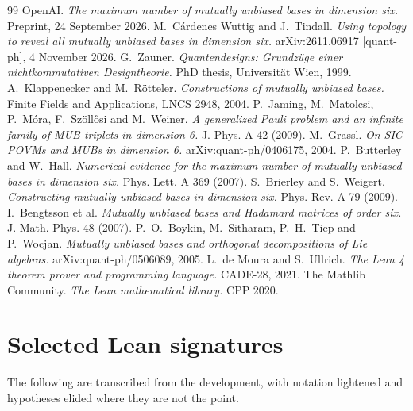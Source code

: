 \documentclass[11pt]{article}
\theoremstyle{definition}
\begin{document}
\begin{thebibliography}{99}
 OpenAI. \emph{The maximum number of mutually unbiased bases in dimension six.}
  Preprint, 24 September 2026.
 M.~C\'ardenes Wuttig and J.~Tindall. \emph{Using topology to reveal all mutually
  unbiased bases in dimension six.} arXiv:2611.06917 [quant-ph], 4 November 2026.
 G.~Zauner. \emph{Quantendesigns: Grundz\"uge einer nichtkommutativen
  Designtheorie.} PhD thesis, Universit\"at Wien, 1999.
 A.~Klappenecker and M.~R\"otteler. \emph{Constructions of mutually unbiased bases.}
  Finite Fields and Applications, LNCS 2948, 2004.
 P.~Jaming, M.~Matolcsi, P.~M\'ora, F.~Sz\"oll\H{o}si and M.~Weiner.
  \emph{A generalized Pauli problem and an infinite family of MUB-triplets in dimension 6.}
  J. Phys. A 42 (2009).
 M.~Grassl. \emph{On SIC-POVMs and MUBs in dimension 6.} arXiv:quant-ph/0406175,
  2004.
 P.~Butterley and W.~Hall. \emph{Numerical evidence for the maximum number of mutually
  unbiased bases in dimension six.} Phys. Lett. A 369 (2007).
 S.~Brierley and S.~Weigert. \emph{Constructing mutually unbiased bases in dimension
  six.} Phys. Rev. A 79 (2009).
 I.~Bengtsson et al. \emph{Mutually unbiased bases and Hadamard matrices of order
  six.} J. Math. Phys. 48 (2007).
 P.~O.~Boykin, M.~Sitharam, P.~H.~Tiep and P.~Wocjan. \emph{Mutually unbiased bases
  and orthogonal decompositions of Lie algebras.} arXiv:quant-ph/0506089, 2005.
 L.~de Moura and S.~Ullrich. \emph{The Lean 4 theorem prover and programming
  language.} CADE-28, 2021.
 The Mathlib Community. \emph{The Lean mathematical library.} CPP 2020.
\end{thebibliography}

\appendix

\section{Selected Lean signatures}
\label{app:sig}

The following are transcribed from the development, with notation lightened and hypotheses
elided where they are not the point.
\end{document}
